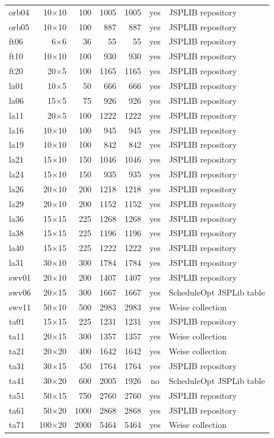 {\begin{longtable}{lrrrrcl}
orb04 & 10$\times$10 & 100 & 1005 & 1005 & yes & JSPLIB repository \\
orb05 & 10$\times$10 & 100 & 887 & 887 & yes & JSPLIB repository \\
ft06 & 6$\times$6 & 36 & 55 & 55 & yes & JSPLIB repository \\
ft10 & 10$\times$10 & 100 & 930 & 930 & yes & JSPLIB repository \\
ft20 & 20$\times$5 & 100 & 1165 & 1165 & yes & JSPLIB repository \\
la01 & 10$\times$5 & 50 & 666 & 666 & yes & JSPLIB repository \\
la06 & 15$\times$5 & 75 & 926 & 926 & yes & JSPLIB repository \\
la11 & 20$\times$5 & 100 & 1222 & 1222 & yes & JSPLIB repository \\
la16 & 10$\times$10 & 100 & 945 & 945 & yes & JSPLIB repository \\
la19 & 10$\times$10 & 100 & 842 & 842 & yes & JSPLIB repository \\
la21 & 15$\times$10 & 150 & 1046 & 1046 & yes & JSPLIB repository \\
la24 & 15$\times$10 & 150 & 935 & 935 & yes & JSPLIB repository \\
la26 & 20$\times$10 & 200 & 1218 & 1218 & yes & JSPLIB repository \\
la29 & 20$\times$10 & 200 & 1152 & 1152 & yes & JSPLIB repository \\
la36 & 15$\times$15 & 225 & 1268 & 1268 & yes & JSPLIB repository \\
la38 & 15$\times$15 & 225 & 1196 & 1196 & yes & JSPLIB repository \\
la40 & 15$\times$15 & 225 & 1222 & 1222 & yes & JSPLIB repository \\
la31 & 30$\times$10 & 300 & 1784 & 1784 & yes & JSPLIB repository \\
swv01 & 20$\times$10 & 200 & 1407 & 1407 & yes & JSPLIB repository \\
swv06 & 20$\times$15 & 300 & 1667 & 1667 & yes & ScheduleOpt JSPLib table \\
swv11 & 50$\times$10 & 500 & 2983 & 2983 & yes & Weise collection \\
ta01 & 15$\times$15 & 225 & 1231 & 1231 & yes & JSPLIB repository \\
ta11 & 20$\times$15 & 300 & 1357 & 1357 & yes & Weise collection \\
ta21 & 20$\times$20 & 400 & 1642 & 1642 & yes & Weise collection \\
ta31 & 30$\times$15 & 450 & 1764 & 1764 & yes & JSPLIB repository \\
ta41 & 30$\times$20 & 600 & 2005 & 1926 & no & ScheduleOpt JSPLib table \\
ta51 & 50$\times$15 & 750 & 2760 & 2760 & yes & JSPLIB repository \\
ta61 & 50$\times$20 & 1000 & 2868 & 2868 & yes & JSPLIB repository \\
ta71 & 100$\times$20 & 2000 & 5464 & 5464 & yes & Weise collection \\
\end{longtable}}
